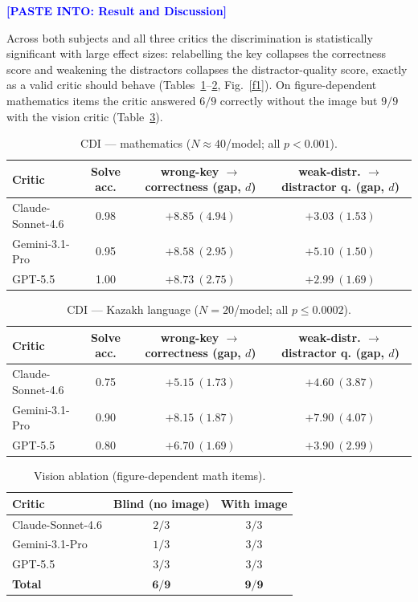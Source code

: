\documentclass[11pt]{article}
\begin{document}
\hrulefill

\textcolor{blue}{\bfseries [PASTE INTO: Result and Discussion]}

Across both subjects and all three critics the discrimination is statistically
significant with large effect sizes: relabelling the key collapses the
correctness score and weakening the distractors collapses the
distractor-quality score, exactly as a valid critic should behave
(Tables~\ref{t1}--\ref{t2}, Fig.~\ref{f1}). On figure-dependent mathematics
items the critic answered $6/9$ correctly without the image but $9/9$ with the
vision critic (Table~\ref{t3}).

\begin{table}[h]\centering\caption{CDI --- mathematics ($N\!\approx\!40$/model; all $p<0.001$).}\label{t1}
\begin{tabular}{lccc}
\toprule
Critic & Solve acc. & wrong-key $\to$ correctness (gap, $d$) & weak-distr. $\to$ distractor q. (gap, $d$)\\
\midrule
Claude-Sonnet-4.6 & 0.98 & $+8.85\ (4.94)$ & $+3.03\ (1.53)$\\
Gemini-3.1-Pro & 0.95 & $+8.58\ (2.95)$ & $+5.10\ (1.50)$\\
GPT-5.5 & 1.00 & $+8.73\ (2.75)$ & $+2.99\ (1.69)$\\
\bottomrule
\end{tabular}\end{table}

\begin{table}[h]\centering\caption{CDI --- Kazakh language ($N\!=\!20$/model; all $p\le0.0002$).}\label{t2}
\begin{tabular}{lccc}
\toprule
Critic & Solve acc. & wrong-key $\to$ correctness (gap, $d$) & weak-distr. $\to$ distractor q. (gap, $d$)\\
\midrule
Claude-Sonnet-4.6 & 0.75 & $+5.15\ (1.73)$ & $+4.60\ (3.87)$\\
Gemini-3.1-Pro & 0.90 & $+8.15\ (1.87)$ & $+7.90\ (4.07)$\\
GPT-5.5 & 0.80 & $+6.70\ (1.69)$ & $+3.90\ (2.99)$\\
\bottomrule
\end{tabular}\end{table}

\begin{table}[h]\centering\caption{Vision ablation (figure-dependent math items).}\label{t3}
\begin{tabular}{lcc}
\toprule
Critic & Blind (no image) & With image\\
\midrule
Claude-Sonnet-4.6 & $2/3$ & $3/3$\\
Gemini-3.1-Pro & $1/3$ & $3/3$\\
GPT-5.5 & $3/3$ & $3/3$\\
\textbf{Total} & $\mathbf{6/9}$ & $\mathbf{9/9}$\\
\bottomrule
\end{tabular}\end{table}
\end{document}
